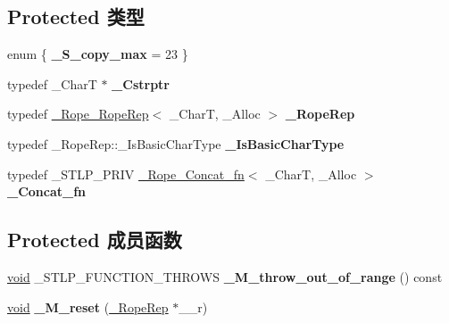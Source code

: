 \subsection*{Protected 类型}
\begin{DoxyCompactItemize}
\item 
\mbox{\label{classrope_a39b715cc34416f836875cc819b7e8a76}} 
enum \{ {\bfseries \+\_\+\+S\+\_\+copy\+\_\+max} = 23
 \}
\item 
\mbox{\label{classrope_a34d0eab3b0769c08c268f3a2e82afe2c}} 
typedef \+\_\+\+CharT $\ast$ {\bfseries \+\_\+\+Cstrptr}
\item 
\mbox{\label{classrope_a88244d58685ab1a10c5bce864b76a236}} 
typedef \hyperlink{struct___rope___rope_rep}{\+\_\+\+Rope\+\_\+\+Rope\+Rep}$<$ \+\_\+\+CharT, \+\_\+\+Alloc $>$ {\bfseries \+\_\+\+Rope\+Rep}
\item 
\mbox{\label{classrope_ac7479e7a45c84fa22620f8ed99726fc3}} 
typedef \+\_\+\+Rope\+Rep\+::\+\_\+\+Is\+Basic\+Char\+Type {\bfseries \+\_\+\+Is\+Basic\+Char\+Type}
\item 
\mbox{\label{classrope_afce1c03d5d04da4ce84e550853b91d5c}} 
typedef \+\_\+\+S\+T\+L\+P\+\_\+\+P\+R\+IV \hyperlink{struct___rope___concat__fn}{\+\_\+\+Rope\+\_\+\+Concat\+\_\+fn}$<$ \+\_\+\+CharT, \+\_\+\+Alloc $>$ {\bfseries \+\_\+\+Concat\+\_\+fn}
\end{DoxyCompactItemize}
\subsection*{Protected 成员函数}
\begin{DoxyCompactItemize}
\item 
\mbox{\label{classrope_a1418f9e3ef70983c6095ddb243a2f022}} 
\hyperlink{interfacevoid}{void} \+\_\+\+S\+T\+L\+P\+\_\+\+F\+U\+N\+C\+T\+I\+O\+N\+\_\+\+T\+H\+R\+O\+WS {\bfseries \+\_\+\+M\+\_\+throw\+\_\+out\+\_\+of\+\_\+range} () const
\item 
\mbox{\label{classrope_a90f6b5016844f6edb584fda1481275ca}} 
\hyperlink{interfacevoid}{void} {\bfseries \+\_\+\+M\+\_\+reset} (\hyperlink{struct___rope___rope_rep}{\+\_\+\+Rope\+Rep} $\ast$\+\_\+\+\_\+r)
\end{DoxyCompactItemize}
